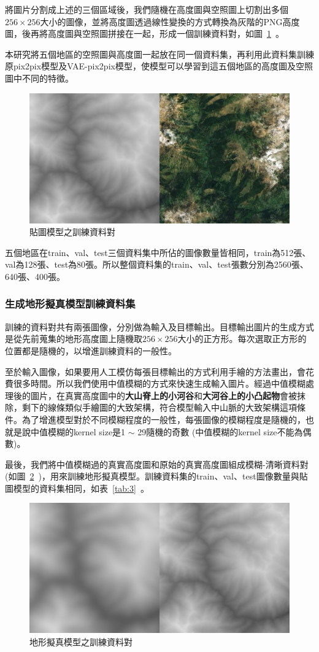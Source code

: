 \documentclass[a4paper, 12pt]{article}
\begin{document}
將圖片分割成上述的三個區域後，我們隨機在高度圖與空照圖上切割出多個$256 \times 256$大小的圖像，並將高度圖透過線性變換的方式轉換為灰階的PNG高度圖，後再將高度圖與空照圖拼接在一起，形成一個訓練資料對，如圖~\ref{fig:9}~。

本研究將五個地區的空照圖與高度圖一起放在同一個資料集，再利用此資料集訓練原pix2pix模型及VAE-pix2pix模型，使模型可以學習到這五個地區的高度圖及空照圖中不同的特徵。

\begin{figure}[htbp]
    \centering
    \includegraphics[width=0.5\linewidth]{fig/9.jpg}
    \caption{貼圖模型之訓練資料對}
    \label{fig:9}
\end{figure}

五個地區在train、val、test三個資料集中所佔的圖像數量皆相同，train為512張、val為128張、test為80張。所以整個資料集的train、val、test張數分別為2560張、640張、400張。

\subsubsection{生成地形擬真模型訓練資料集}

訓練的資料對共有兩張圖像，分別做為輸入及目標輸出。目標輸出圖片的生成方式是從先前蒐集的地形高度圖上隨機取$256 \times 256$大小的正方形。每次選取正方形的位置都是隨機的，以增進訓練資料的一般性。

至於輸入圖像，如果要用人工模仿每張目標輸出的方式利用手繪的方法畫出，會花費很多時間。所以我們使用中值模糊的方式來快速生成輸入圖片。經過中值模糊處理後的圖片，在真實高度圖中的\textbf{大山脊上的小河谷}和\textbf{大河谷上的小凸起物}會被抹除，剩下的線條類似手繪圖的大致架構，符合模型輸入中山脈的大致架構這項條件。為了增進模型對於不同模糊程度的一般性，每張圖像的模糊程度是隨機的，也就是說中值模糊的kernel size是1 $\sim$ 29隨機的奇數 (中值模糊的kernel size不能為偶數)。

最後，我們將中值模糊過的真實高度圖和原始的真實高度圖組成模糊-清晰資料對(如圖~\ref{fig:10}~)，用來訓練地形擬真模型。訓練資料集的train、val、test圖像數量與貼圖模型的資料集相同，如表~\ref{tab:3}~。

\begin{figure}[htbp]
    \centering
    \includegraphics[width=0.5\linewidth]{fig/10.jpg}
    \caption{地形擬真模型之訓練資料對}
    \label{fig:10}
\end{figure}
\end{document}

